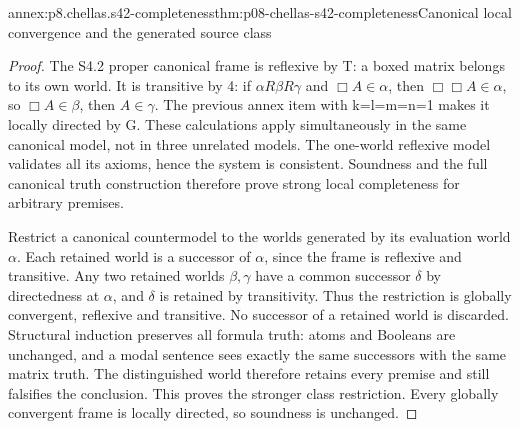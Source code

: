 \begin{annexitem}{annex:p8.chellas.s42-completeness}{thm:p08-chellas-s42-completeness}{Canonical local convergence and the generated source class}
\begin{proof}
The S4.2 proper canonical frame is reflexive by T: a boxed matrix
belongs to its own world. It is transitive by 4: if
\(\alpha R\beta R\gamma\) and \(\Box A\in\alpha\), then
\(\Box\Box A\in\alpha\), so \(\Box A\in\beta\), then
\(A\in\gamma\). The previous annex item with k=l=m=n=1
makes it locally directed by G. These calculations apply simultaneously
in the same canonical model, not in three unrelated models.
The one-world reflexive model validates all its axioms, hence the
system is consistent. Soundness and the full canonical truth construction
therefore prove strong local completeness for arbitrary premises.

Restrict a canonical countermodel to the worlds generated by its
evaluation world \(\alpha\). Each retained world is a successor
of \(\alpha\), since the frame is reflexive and transitive.
Any two retained worlds \(\beta,\gamma\) have a common successor
\(\delta\) by directedness at \(\alpha\), and \(\delta\)
is retained by transitivity. Thus the restriction is globally
convergent, reflexive and transitive. No successor of a retained world
is discarded. Structural induction preserves all formula truth:
atoms and Booleans are unchanged, and a modal sentence sees exactly
the same successors with the same matrix truth. The distinguished
world therefore retains every premise and still falsifies the conclusion.
This proves the stronger class restriction. Every globally convergent
frame is locally directed, so soundness is unchanged.
\end{proof}
\end{annexitem}

